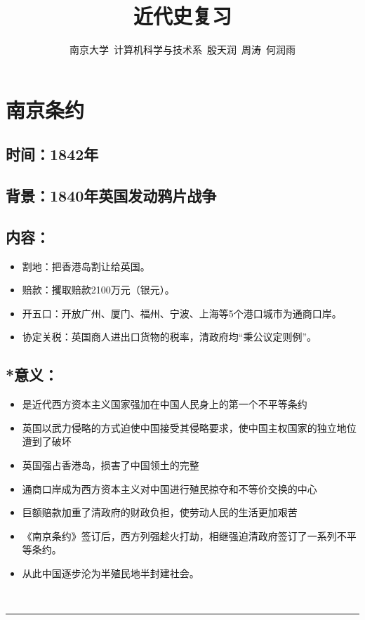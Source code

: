\documentclass{article}
\begin{document}
\title{近代史复习}

\author{南京大学~计算机科学与技术系~殷天润~周涛~何润雨}
\maketitle

\section*{南京条约}
\subsection*{时间：1842年}
\subsection*{背景：1840年英国发动鸦片战争}

\subsection*{内容：}
\begin{itemize}
    \item 割地：把香港岛割让给英国。
    \item 赔款：攫取赔款2100万元（银元）。
    \item 开五口：开放广州、厦门、福州、宁波、上海等5个港口城市为通商口岸。
    \item 协定关税：英国商人进出口货物的税率，清政府均“秉公议定则例”。
\end{itemize}
\subsection*{*意义：}
\begin{itemize}
   \item 是近代西方资本主义国家强加在中国人民身上的第一个不平等条约
   \item 英国以武力侵略的方式迫使中国接受其侵略要求，使中国主权国家的独立地位遭到了破坏
   \item 英国强占香港岛，损害了中国领土的完整
   \item 通商口岸成为西方资本主义对中国进行殖民掠夺和不等价交换的中心
   \item 巨额赔款加重了清政府的财政负担，使劳动人民的生活更加艰苦
   \item 《南京条约》签订后，西方列强趁火打劫，相继强迫清政府签订了一系列不平等条约。
   \item 从此中国逐步沦为半殖民地半封建社会。
\end{itemize}
\ \hrule
\end{document}
